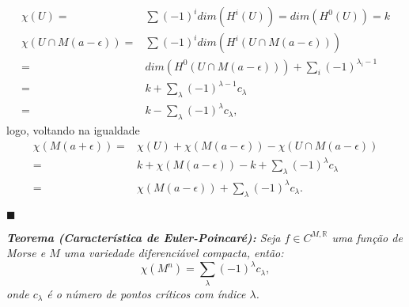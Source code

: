 \documentclass{article}
\begin{document}
	$$
	\begin{aligned}
	\chi(U) =& \sum (-1)^{i}dim(H^{i}(U)) = dim(H^{0}(U)) = k
	\\
	\chi(U \cap M(a-\epsilon)) =& \sum (-1)^{i}dim(H^{i}(U \cap M(a-\epsilon))) 
	\\
	=& dim(H^{0}(U \cap M(a-\epsilon))) + \sum_{i}(-1)^{\lambda_{i} - 1} 
	\\
	=& k + \sum_{\lambda}(-1)^{\lambda - 1}c_{\lambda} 
	\\
	=& k - \sum_{\lambda}(-1)^{\lambda}c_{\lambda},
	\end{aligned}
	$$
	logo, voltando na igualdade 
	$$
	\begin{aligned}
	\chi(M(a+\epsilon)) =& \chi(U) + \chi(M(a-\epsilon)) - \chi(U \cap M(a-\epsilon))
	\\
	=& k +\chi(M(a-\epsilon)) - k + \sum_{\lambda}(-1)^{\lambda}c_{\lambda}
	\\
	=& \chi(M(a-\epsilon)) + \sum_{\lambda}(-1)^{\lambda}c_{\lambda}.
	\end{aligned}
	$$
	
	$\blacksquare$
	
	\vspace{2mm}
	\textit{\textbf{Teorema (Característica de Euler-Poincaré):} Seja $f \in C^{M, \mathbb{R}}$ uma função de Morse e $M$ uma variedade diferenciável compacta, então:
		$$
		\chi(M^{n}) = \sum_{\lambda}(-1)^{\lambda}c_{\lambda},
		$$
		onde $c_{\lambda}$ é o número de pontos críticos com índice $\lambda$.}
	
\end{document}
